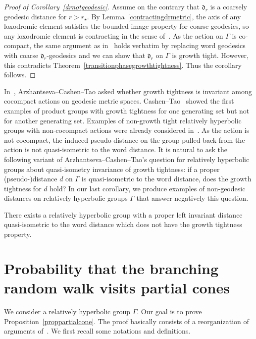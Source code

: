 \documentclass[AHL,Unicode,longabstracts]{cedram}
\newcommand{\fkd}{\mathfrak{d}}
\begin{document}
\begin{proof}[{Proof of Corollary~\ref{drnotgeodesic}}]
Assume on the contrary that $\fkd_r$ is a coarsely geodesic distance for $r>r_\star$. By Lemma~\ref{contractingdrmetric}, the axis of any loxodromic element satisfies the bounded image property for coarse geodesics, so any loxodromic element is contracting in the sense of~\cite{YangTight}. As the action on $\Gamma$ is co-compact, the same argument as in~\cite{YangTight} holds verbatim by replacing word geodesics with coarse $\fkd_r$-geodesics and we can show that $\fkd_r$ on $\Gamma$ is growth tight. However, this contradicts Theorem~\ref{transitionphasegrowthtightness}. Thus the corollary follows.
\end{proof}

In~\cite[Question 1]{ACT}, Arzhantseva--Cashen--Tao asked whether growth tightness is invariant among cocompact actions on geodesic metric spaces. Cashen--Tao~\cite{CaTao16} showed the first examples of product groups with growth tightness for one generating set but not for another generating set. Examples of non-growth tight relatively hyperbolic groups with non-cocompact actions were already considered in~\cite[Observation~8.8]{ACT}. As the action is not-cocompact, the induced pseudo-distance on the group pulled back from the action is not quasi-isometric to the word distance. It is natural to ask the following variant of Arzhantseva--Cashen--Tao's question for relatively hyperbolic groups about quasi-isometry invariance of growth tightness: if a proper (pseudo-)distance $d$ on $\Gamma$ is quasi-isometric to the word distance, does the growth tightness for $d$ hold? In our last corollary, we produce examples of non-geodesic distances on relatively hyperbolic groups $\Gamma$ that answer negatively this question.
\begin{coro}\label{corgrowthtightness}
There exists a relatively hyperbolic group with a proper left invariant distance quasi-isometric to the word distance which does not have the growth tightness property.
\end{coro}


\appendix
\section{Probability that the branching random walk visits partial cones}\label{app}


We consider a relatively hyperbolic group $\Gamma$. Our goal is to prove Proposition~\ref{proppartialcone}. The proof basically consists of a reorganization of arguments of~\cite{DWY}. We first recall some notations and definitions.
\end{document}
